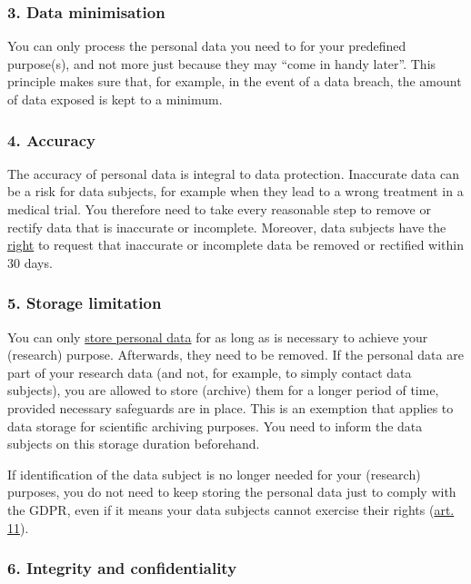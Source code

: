 \documentclass[
]{book}
\begin{document}
\hypertarget{data-minimisation}{%
\subsubsection{3. Data minimisation}\label{data-minimisation}}

You can only process the personal data you need to for your predefined purpose(s),
and not more just because they may ``come in handy later''. This principle makes
sure that, for example, in the event of a data breach, the amount of data exposed
is kept to a minimum.

\hypertarget{accuracy}{%
\subsubsection{4. Accuracy}\label{accuracy}}

The accuracy of personal data is integral to data protection. Inaccurate data
can be a risk for data subjects, for example when they lead to a wrong treatment
in a medical trial. You therefore need to take every reasonable step to remove
or rectify data that is inaccurate or incomplete. Moreover, data subjects have
the \protect\hyperlink{data-subject-rights}{right} to request that inaccurate or
incomplete data be removed or rectified within 30 days.

\hypertarget{storage-limitation}{%
\subsubsection{5. Storage limitation}\label{storage-limitation}}

You can only \protect\hyperlink{data-storage}{store personal data} for as long as is
necessary to achieve your (research) purpose. Afterwards, they need to be
removed. If the personal data are part of your research data (and not, for
example, to simply contact data subjects), you are allowed to store (archive)
them for a longer period of time, provided necessary safeguards are in place.
This is an exemption that applies to data storage for scientific archiving
purposes. You need to inform the data subjects on this storage duration beforehand.

If identification of the data subject is no longer needed for your
(research) purposes, you do not need to keep storing the personal data just
to comply with the GDPR, even if it means your data subjects cannot exercise
their rights (\href{https://gdpr-info.eu/art-11-gdpr/}{art. 11}).

\hypertarget{integrity-and-confidentiality}{%
\subsubsection{6. Integrity and confidentiality}\label{integrity-and-confidentiality}}
\end{document}
